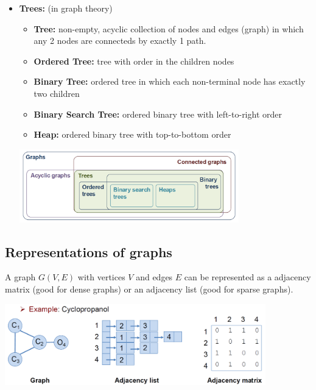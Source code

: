\begin{itemize}
    \item \textbf{Trees:} (in graph theory)
    \begin{itemize}
        \item \textbf{Tree:} non-empty, acyclic collection of nodes and edges (graph) in which any 2 nodes are connecteds by exactly 1 path.  
        \item \textbf{Ordered Tree:} tree with order in the children nodes
        \item \textbf{Binary Tree:} ordered tree in which each non-terminal node has exactly two children
        \item \textbf{Binary Search Tree:} ordered binary tree with left-to-right order
        \item \textbf{Heap:} ordered binary tree with top-to-bottom order
    \end{itemize}
    \begin{center}\includegraphics[width=0.75\textwidth]{img/graphs/GraphsTrees.png}\end{center}
\end{itemize}

\subsection{Representations of graphs}

A graph $G(V,E)$ with vertices $V$ and edges $E$ can be represented as a adjacency matrix (good for dense graphs) or an adjacency list (good for sparse graphs). 

\begin{center}\includegraphics[width=0.85\textwidth]{img/graphs/MatrixVsList.png}\end{center}

